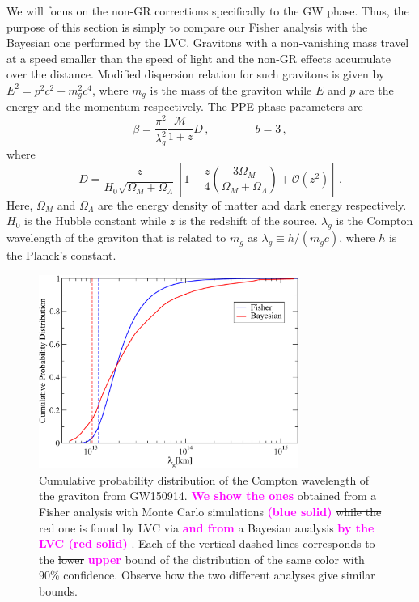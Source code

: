 \documentclass[prd,twocolumn,nofootinbib]{revtex4-1}
\newcommand\be{\begin{equation}}
\newcommand\ee{\end{equation}}
\newcommand{\lb}{\left(}
\newcommand{\rb}{\right)}
\newcommand{\kent}[1]{\textcolor{magenta}{\textbf{#1}} }
\begin{document}
We will focus on the non-GR corrections specifically to the GW phase. Thus, the purpose of this section is simply to compare our Fisher analysis with the Bayesian one performed by the LVC. Gravitons with a non-vanishing mass travel at a speed smaller than the speed of light and the non-GR effects accumulate over the distance. Modified dispersion relation for such gravitons is given by $ E^2=p^2c^2+m_g^2c^4$, where $m_g$ is the mass of the graviton while $E$ and $p$ are the energy and the momentum respectively. The PPE phase parameters are~\cite{Will:1997bb}
\be
\beta=\frac{\pi^2}{\lambda_g^2}\frac{\mathcal{M}}{1+z}D\,, \qquad \qquad b=3\,,
\ee
where
\be
D=\frac{z}{H_0\sqrt{\Omega_M+\Omega_{\Lambda}}}\left[1-\frac{z}{4}\left(\frac{3\Omega_M}{\Omega_M+\Omega_{\Lambda}} \right )+\mathcal{O}(z^2)\right]\,.
\ee
Here, $\Omega_M$ and $\Omega_\Lambda$ are the energy density of matter and dark energy respectively. $H_0$ is the Hubble constant while $z$ is the redshift of the source. $\lambda_g$ is the Compton wavelength of the graviton that is related to $m_g$ as $\lambda_g\equiv h/\lb m_gc\rb$, where $h$ is the Planck's constant.

\begin{figure}[htb]
\includegraphics[width=8.5cm]{graviton.pdf}
\caption{Cumulative probability distribution of the Compton wavelength of the graviton from GW150914. \kent{We show the ones} obtained from a Fisher analysis with Monte Carlo simulations \kent{(blue solid)} \sout{while the red one is found by LVC via} \kent{and from} a Bayesian analysis \kent{by the LVC (red solid)}. Each of the vertical dashed lines corresponds to the \sout{lower} \kent{upper} bound of the distribution of the same color with 90\% confidence. Observe how the two different analyses give similar bounds.}
\label{fig:graviton}
\end{figure}
\end{document}

